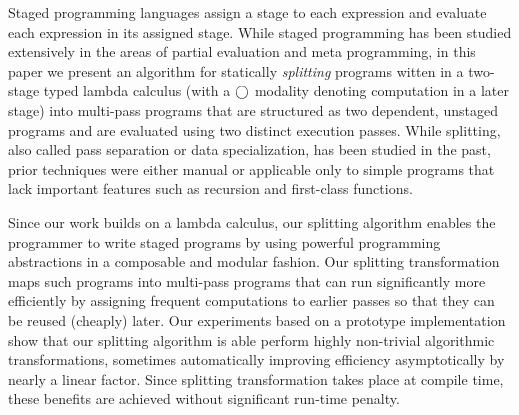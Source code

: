Staged programming languages assign a stage to each expression and
evaluate each expression in its assigned stage.
While staged programming has been studied extensively in the areas of
partial evaluation and meta programming, in this paper we present an
algorithm for statically {\em splitting} programs witten in a
two-stage typed lambda calculus (with a $\bigcirc$ modality denoting
computation in a later stage) into multi-pass programs that are
structured as two dependent, unstaged programs and are evaluated using
two distinct execution passes.  While splitting, also called pass
separation or data specialization, has been studied in the past, prior
techniques were either manual or applicable only to simple programs
that lack important features such as recursion and first-class
functions.

Since our work builds on a lambda calculus, our splitting algorithm
enables the programmer to write staged programs by using powerful
programming abstractions in a composable and modular fashion. Our
splitting transformation maps such programs into multi-pass programs
that can run significantly more efficiently by assigning frequent
computations to earlier passes so that they can be reused (cheaply)
later.  Our experiments based on a prototype implementation show that
our splitting algorithm is able perform highly non-trivial algorithmic
transformations, sometimes automatically improving efficiency
asymptotically by nearly a linear factor.  Since splitting
transformation takes place at compile time, these benefits are
achieved without significant run-time penalty.





